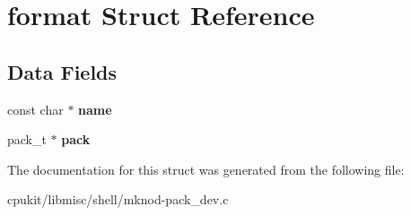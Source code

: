\hypertarget{structformat}{}\section{format Struct Reference}
\label{structformat}
\subsection*{Data Fields}
\begin{DoxyCompactItemize}
\item 
\mbox{\label{structformat_a6339077267dc988eb2739d451be30c06}} 
const char $\ast$ {\bfseries name}
\item 
\mbox{\label{structformat_a9e405495a69c679a7e4f824c6a721c12}} 
pack\+\_\+t $\ast$ {\bfseries pack}
\end{DoxyCompactItemize}


The documentation for this struct was generated from the following file\+:\begin{DoxyCompactItemize}
\item 
cpukit/libmisc/shell/mknod-\/pack\+\_\+dev.\+c\end{DoxyCompactItemize}
